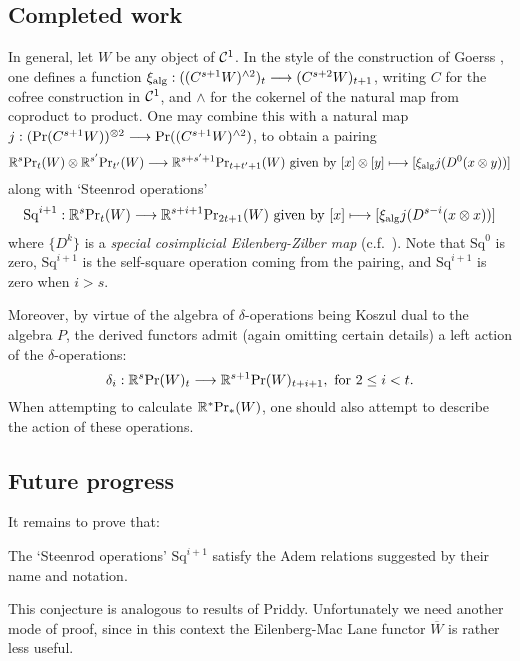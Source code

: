 \documentclass[11pt]{article}
\newcommand{\Sq}{\mathrm{Sq}}
\begin{document}
\subsection{Completed work}\label{PastWorkOnE2LevelStructure}
In general, let $W$ be any object of $\calC^1$. In the style of the construction of Goerss  \cite[\S5]{MR1089001}, one defines a function $\xi_\textup{alg}:((C^{s+1}W)^{\wedge2})_{t}\to (C^{s+2}W)_{t+1}$, writing $C$ for the cofree construction in $\calC^1$, and $\wedge $ for the cokernel of the natural map from coproduct to product. One may combine this with a natural map $j:(\textup{Pr}(C^{s+1}W))^{\otimes2}\to \textup{Pr}((C^{s+1}W)^{\wedge 2})$, to obtain a pairing
\[\mathbb{R}^s\textup{Pr}_t(W)\otimes \mathbb{R}^{s'}\textup{Pr}_{t'}(W)\to \mathbb{R}^{s+s'+1}\textup{Pr}_{t+t'+1}(W)\textup{ given by }[x]\otimes [y]\mapsto [\xi_{\textup{alg}}j(D^0(x\otimes y))]\]
along with `Steenrod operations'
\[\Sq^{i+1}:\mathbb{R}^s\textup{Pr}_t(W)\to \mathbb{R}^{s+i+1}\textup{Pr}_{2t+1}(W)\textup{ given by }[x]\mapsto [\xi_{\textup{alg}}j(D^{s-i}(x\otimes x))]\]
where $\{D^k\}$ is a \emph{special cosimplicial Eilenberg-Zilber map} (c.f.\ \cite[5.2]{turner_opns_and_sseqs_I.pdf}). Note that $\Sq^0$ is zero, $\Sq^{i+1}$ is the self-square operation coming from the pairing, and $\Sq^{i+1}$ is zero when $i>s$.

Moreover, by virtue of the algebra of $\delta$-operations being Koszul dual to the algebra $P$, the derived functors admit (again omitting certain details) a left action of the $\delta$-operations:
\[\delta_i:\mathbb{R}^s\textup{Pr}(W)_t\to \mathbb{R}^{s+1}\textup{Pr}(W)_{t+i+1},\textup{ for $2\leq i<t$}.\]
When attempting to calculate $\mathbb{R}^*\textup{Pr}_*(W)$, one should also attempt to describe the action of these operations.


\subsection{Future progress}
It remains to prove that:
\begin{conjecture}
The `Steenrod operations' $\Sq^{i+1}$ satisfy the Adem relations suggested by their name and notation.
\end{conjecture}
\noindent This conjecture is analogous to results \cite[5.3]{PriddySimplicialLie.pdf} of Priddy. Unfortunately we need another mode of proof, since in this context the Eilenberg-Mac Lane functor $\overline{W}$ is rather less useful.
\end{document}
